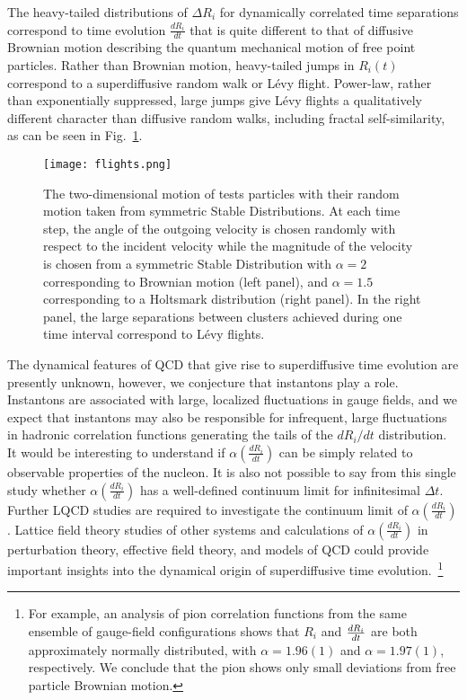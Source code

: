 The heavy-tailed distributions of $\Delta R_i$ for dynamically correlated time separations correspond to time evolution $\frac{dR_i}{dt}$ 
that is quite  different to that of diffusive Brownian motion  describing the   quantum mechanical motion of free point particles. 
Rather than Brownian motion, heavy-tailed jumps in $R_i(t)$ correspond to a superdiffusive random walk or L{\'e}vy flight. 
Power-law, rather than exponentially suppressed, large jumps give L{\'e}vy flights a qualitatively different character than 
diffusive random walks, including fractal self-similarity, as can be seen in Fig.~\ref{fig:levyflights}.
%
\begin{figure}[!ht]
  \centering
  \texttt{[image: flights.png]}
  \caption{
  The two-dimensional motion of tests particles with their random motion taken from symmetric Stable Distributions.
  At each time step, the angle of the outgoing velocity is chosen randomly with respect to the incident velocity 
  while the magnitude of the velocity is chosen from a symmetric Stable Distribution with $\alpha=2$ 
  corresponding to Brownian motion (left panel), 
  and $\alpha=1.5$ corresponding to a Holtsmark distribution (right panel).
  In the right panel, the large separations between clusters achieved during one time interval correspond to L{\'e}vy flights.
    }
  \label{fig:levyflights}
\end{figure}
%
The dynamical features of QCD that give rise to superdiffusive time evolution are presently unknown, however, 
we conjecture that instantons play a  role.
Instantons are associated with large, localized fluctuations in gauge fields,
and we expect that instantons may also be responsible for infrequent, large fluctuations 
in hadronic correlation functions generating the tails of the $dR_i/dt$ distribution.
It would be interesting to understand if 
 $\alpha\left( \frac{dR_i}{dt} \right)$ can be simply related to observable properties of the nucleon. 
It is also not possible to say from this single study whether $\alpha\left( \frac{dR_i}{dt} \right)$ has a well-defined 
continuum limit for infinitesimal $\Delta t$. 
Further LQCD studies are required to investigate the 
continuum limit of $\alpha\left( \frac{dR_i}{dt} \right)$. 
Lattice field theory studies of other systems and 
calculations of $\alpha\left( \frac{dR_i}{dt} \right)$ in perturbation theory, effective field theory, 
and models of QCD could  provide important insights into the dynamical origin of superdiffusive time evolution.~\footnote{
For example, 
an analysis of  pion correlation functions from the same ensemble of gauge-field configurations
shows that  $R_i$ and ${dR_i\over dt}$ are 
both approximately normally distributed, with $\alpha=1.96(1)$ and 
$\alpha=1.97(1)$,
respectively.
We conclude that the pion shows only small deviations from free particle Brownian motion.
}





